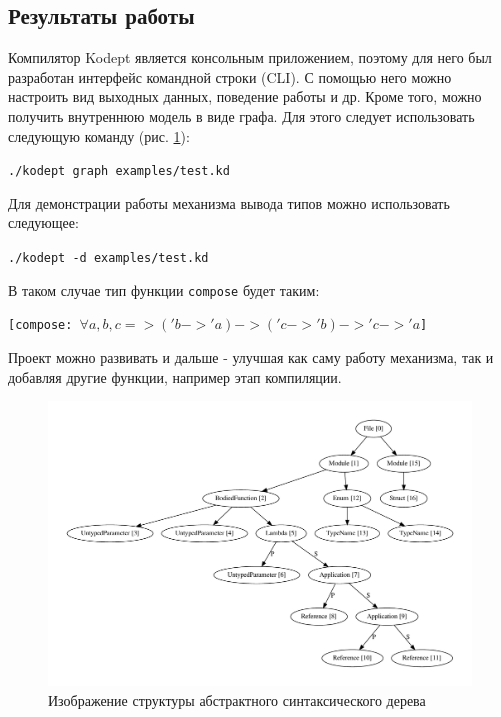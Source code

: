 ﻿%
\subsection{Результаты работы}
\begin{frame}%

    Компилятор Kodept является консольным приложением, поэтому для него был разработан интерфейс командной строки (CLI).
    С помощью него можно настроить вид выходных данных, поведение работы и др.
    Кроме того, можно получить внутреннюю модель в виде графа.
    Для этого следует использовать следующую команду (рис. \ref{fig:ast_dot}):

    \begin{center}
        \texttt{./kodept graph examples/test.kd}
    \end{center}

    Для демонстрации работы механизма вывода типов можно использовать следующее:

    \begin{center}
        \texttt{./kodept -d examples/test.kd}
    \end{center}

    В таком случае тип функции \lstinline{compose} будет таким:

    \begin{center}
        \texttt{[compose: $\forall a, b, c => ('b -> 'a) -> ('c -> 'b) -> 'c -> 'a$]}
    \end{center}

    \vspace{0.5cm}

    Проект можно развивать и дальше - улучшая как саму работу механизма, так и добавляя другие функции, например этап компиляции.

\end{frame}

\begin{frame}
    \begin{figure}[H]
        \centering
        \includegraphics[height=0.8\textheight]{figures/dot}
        \caption{Изображение структуры абстрактного синтаксического дерева}
        \label{fig:ast_dot}
    \end{figure}
\end{frame}
